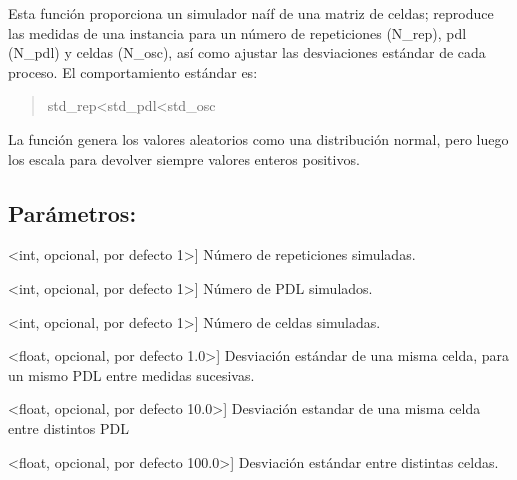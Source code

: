\documentclass[letterpaper,10pt,english]{sphinxmanual}
\begin{document}
\begin{fulllineitems}
\label{\detokenize{myfpga:myfpga.ring_osc.sim_romatrix}}
\pysigstartsignatures
{}
\pysigstopsignatures
\sphinxAtStartPar
Esta función proporciona un simulador naíf de una matriz de celdas; reproduce
las medidas de una instancia para un número de repeticiones (N\_rep), pdl (N\_pdl)
y celdas (N\_osc), así como ajustar las desviaciones estándar de cada proceso.
El comportamiento estándar es:
\begin{quote}

\sphinxAtStartPar
std\_rep\textless{}std\_pdl\textless{}std\_osc
\end{quote}

\sphinxAtStartPar
La función genera los valores aleatorios como una distribución normal, pero
luego los escala para devolver siempre valores enteros positivos.


\subsection{Parámetros:}
\label{\detokenize{myfpga:id12}}\begin{description}
\sphinxlineitem{N\_rep}{[}\textless{}int, opcional, por defecto 1\textgreater{}{]}
\sphinxAtStartPar
Número de repeticiones simuladas.

\sphinxlineitem{N\_pdl}{[}\textless{}int, opcional, por defecto 1\textgreater{}{]}
\sphinxAtStartPar
Número de PDL simulados.

\sphinxlineitem{N\_osc}{[}\textless{}int, opcional, por defecto 1\textgreater{}{]}
\sphinxAtStartPar
Número de celdas simuladas.

\sphinxlineitem{std\_rep}{[}\textless{}float, opcional, por defecto 1.0\textgreater{}{]}
\sphinxAtStartPar
Desviación estándar de una misma celda, para un mismo PDL entre
medidas sucesivas.

\sphinxlineitem{std\_pdl}{[}\textless{}float, opcional, por defecto 10.0\textgreater{}{]}
\sphinxAtStartPar
Desviación estandar de una misma celda entre distintos PDL

\sphinxlineitem{std\_osc}{[}\textless{}float, opcional, por defecto 100.0\textgreater{}{]}
\sphinxAtStartPar
Desviación estándar entre distintas celdas.

\end{description}

\end{fulllineitems}
\end{document}
